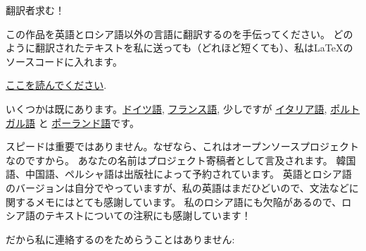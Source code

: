 \vspace*{\fill}

\Huge 翻訳者求む！

\normalsize

\bigskip
\bigskip
\bigskip

この作品を英語とロシア語以外の言語に翻訳するのを手伝ってください。
どのように翻訳されたテキストを私に送っても（どれほど短くても）、私はLaTeXのソースコードに入れます。

\href{\GitHubBlobMasterURL/Translation.md}{ここを読んでください}.

いくつかは既にあります。\href{https://beginners.re/RE4B-DE.pdf}{ドイツ語},
\href{https://beginners.re/RE4B-FR.pdf}{フランス語}, 少しですが
\href{https://yurichev.com/tmp/RE4B-IT-partial.pdf}{イタリア語},
\href{https://yurichev.com/tmp/RE4B-PTBR-lite2.pdf}{ポルトガル語} と
\href{https://yurichev.com/tmp/RE4B-PL.pdf}{ポーランド語}です。

スピードは重要ではありません。なぜなら、これはオープンソースプロジェクトなのですから。
あなたの名前はプロジェクト寄稿者として言及されます。
韓国語、中国語、ペルシャ語は出版社によって予約されています。
英語とロシア語のバージョンは自分でやっていますが、私の英語はまだひどいので、文法などに関するメモにはとても感謝しています。
私のロシア語にも欠陥があるので、ロシア語のテキストについての注釈にも感謝しています！

だから私に連絡するのをためらうことはありません: \GTT{\EMAIL}

\vspace*{\fill}
\vfill
